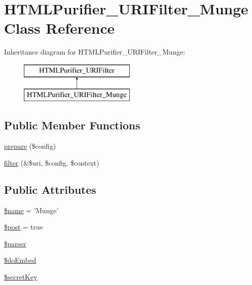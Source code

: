 \hypertarget{classHTMLPurifier__URIFilter__Munge}{\section{H\+T\+M\+L\+Purifier\+\_\+\+U\+R\+I\+Filter\+\_\+\+Munge Class Reference}
\label{classHTMLPurifier__URIFilter__Munge}
}
Inheritance diagram for H\+T\+M\+L\+Purifier\+\_\+\+U\+R\+I\+Filter\+\_\+\+Munge\+:\begin{figure}[H]
\begin{center}
\leavevmode
\includegraphics[height=2.000000cm]{classHTMLPurifier__URIFilter__Munge}
\end{center}
\end{figure}
\subsection*{Public Member Functions}
\begin{DoxyCompactItemize}
\item 
\hyperlink{classHTMLPurifier__URIFilter__Munge_a7e35577a76fd3a77cb3848c3fa1587e7}{prepare} (\$config)
\item 
\hyperlink{classHTMLPurifier__URIFilter__Munge_af8ce7abd164f0e908e779007031561cc}{filter} (\&\$uri, \$config, \$context)
\end{DoxyCompactItemize}
\subsection*{Public Attributes}
\begin{DoxyCompactItemize}
\item 
\hyperlink{classHTMLPurifier__URIFilter__Munge_ae5035385c97162b392da13544a4ab4d6}{\$name} = 'Munge'
\item 
\hyperlink{classHTMLPurifier__URIFilter__Munge_a57096486fc926a1cb2af8361999bba9c}{\$post} = true
\item 
\hyperlink{classHTMLPurifier__URIFilter__Munge_a40af53603e0131ba2be27ac4af64d977}{\$parser}
\item 
\hyperlink{classHTMLPurifier__URIFilter__Munge_a10e8d0dd0bb0c9d3c35c90f406552428}{\$do\+Embed}
\item 
\hyperlink{classHTMLPurifier__URIFilter__Munge_ad8f47e61f8584367c9da43de39144e4e}{\$secret\+Key}
\end{DoxyCompactItemize}
